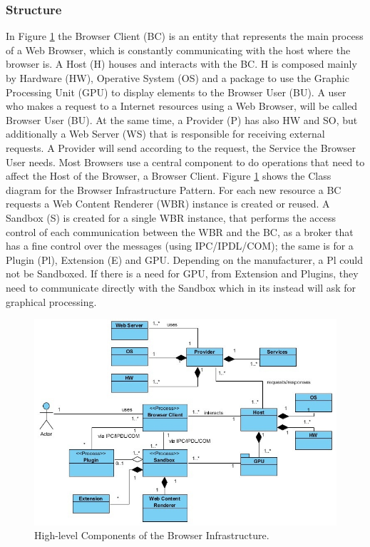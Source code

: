 \documentclass{sig-alternate-05-2015}
\begin{document}
    \subsubsection*{Structure}
    In Figure \ref{fig:BIPatt} the Browser Client (BC) is an entity that represents the main process of a Web Browser, which is constantly communicating with the host where the browser is. A Host (H) houses and interacts with the BC. H is composed mainly by Hardware (HW), Operative System (OS) and a package to use the Graphic Processing Unit (GPU) to display elements to the Browser User (BU). A user who makes a request to a Internet resources using a Web Browser, will be called Browser User (BU). At the same time, a Provider (P) has also HW and SO, but additionally a Web Server (WS) that is responsible for receiving external requests. A Provider will send according to the request, the Service the Browser User needs. Most Browsers use a central component to do operations that need to affect the Host of the Browser, a Browser Client. Figure \ref{fig:BIPatt} shows the Class diagram for the Browser Infrastructure Pattern. For each new resource a BC requests a Web Content Renderer (WBR) instance is created or reused. A Sandbox (S) is created for a single WBR instance, that performs the access control of each communication between the WBR and the BC, as a broker that has a fine control over the messages (using IPC/IPDL/COM); the same is for a Plugin (Pl), Extension (E) and GPU. Depending on the manufacturer, a Pl could not be Sandboxed. If there is a need for GPU, from Extension and Plugins, they need to communicate directly with the Sandbox which in its instead will ask for graphical processing.

    \begin{figure}[h!t]
      \centering
      \includegraphics[scale=0.85]{figures/patron_v6.jpg}
      \caption{High-level Components of the Browser Infrastructure.}
      \label{fig:BIPatt}
    \end{figure}
\end{document}
